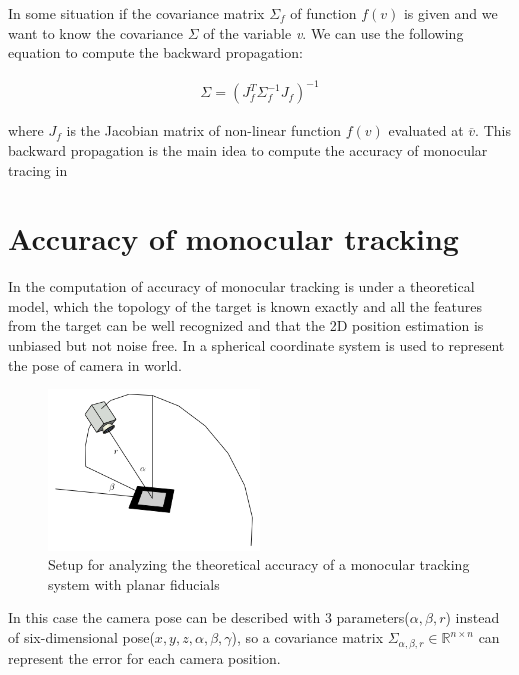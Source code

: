 In some situation if the covariance matrix $\Sigma_f$ of function $f(v)$ is given and we want to know the covariance $\Sigma$ of the variable \textit{v}. We can use the following equation to compute the backward propagation:

\begin{align*}
\Sigma = (J_f^T \Sigma_f^{-1} J_f)^{-1}
\end{align*}

where $J_f$ is the Jacobian matrix of non-linear function $f(v)$ evaluated at $\overline{v}$.
This backward propagation is the main idea to compute the accuracy of monocular tracing in \cite{bauer2007tracking}

\section{Accuracy of monocular tracking}
In \cite{bauer2007tracking}
the computation of accuracy of monocular tracking is under a theoretical model, which the topology of the target is known exactly and all the features from the target can be well recognized and that the 2D position estimation is unbiased but not noise free. In \cite{bauer2007tracking}
a spherical coordinate system is used to represent the pose of camera in world.

\begin{figure}[h!]
\centering
\includegraphics[width=0.5\textwidth]{./fig/spherical.png}
    \caption{Setup for analyzing the theoretical accuracy of a monocular tracking
system with planar fiducials\cite{bauer2007tracking}}
\label{fig:spherical}
\end{figure}

In this case the camera pose can be described with 3 parameters($\alpha,\beta,r$) instead of six-dimensional pose($x,y,z,\alpha,\beta,\gamma$), so a covariance matrix $\Sigma_{\alpha,\beta,r} \in \mathbb{R}^{n \times n}$ can represent the error for each camera position.

